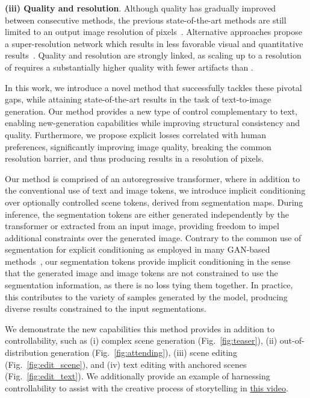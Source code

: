 \documentclass[final]{cvpr}
\begin{document}
{\textbf{(iii) Quality and resolution}}. Although quality has gradually improved between consecutive methods, the previous state-of-the-art methods are still limited to an output image resolution of  pixels~\cite{ramesh2021zero,nichol2021glide}. Alternative approaches propose a super-resolution network which results in less favorable visual and quantitative results~\cite{ding2021cogview}. Quality and resolution are strongly linked, as scaling up to a resolution of  requires a substantially higher quality with fewer artifacts than .

In this work, we introduce a novel method that successfully tackles these pivotal gaps, while attaining state-of-the-art results in the task of text-to-image generation. Our method provides a new type of control complementary to text, enabling new-generation capabilities while improving structural consistency and quality. Furthermore, we propose explicit losses correlated with human preferences, significantly improving image quality, breaking the common resolution barrier, and thus producing results in a resolution of  pixels.

Our method is comprised of an autoregressive transformer, where in addition to the conventional use of text and image tokens, we introduce implicit conditioning over optionally controlled scene tokens, derived from segmentation maps. During inference, the segmentation tokens are either generated independently by the transformer or extracted from an input image, providing freedom to impel additional constraints over the generated image.
Contrary to the common use of segmentation for explicit conditioning as employed in many GAN-based methods~\cite{isola2017image,wang2018high,park2019semantic}, our segmentation tokens provide implicit conditioning in the sense that the generated image and image tokens are not constrained to use the segmentation information, as there is no loss tying them together. In practice, this contributes to the variety of samples generated by the model, producing diverse results constrained to the input segmentations.

We demonstrate the new capabilities this method provides in addition to controllability, such as (i) complex scene generation (Fig.~\ref{fig:teaser}), (ii) out-of-distribution generation (Fig.~\ref{fig:attending}), (iii) scene editing (Fig.~\ref{fig:edit_scene}), and (iv) text editing with anchored scenes (Fig.~\ref{fig:edit_text}). We additionally provide an example of harnessing controllability to assist with the creative process of storytelling in \href{https://youtu.be/QLTyqoJJKTo}{this video}.
\end{document}
